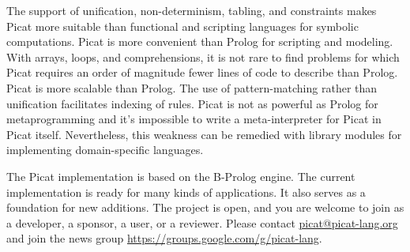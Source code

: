The support of unification, non-determinism, tabling, and constraints makes Picat more suitable than functional and scripting languages for symbolic computations. Picat is more convenient than Prolog for scripting and modeling. With arrays, loops, and comprehensions, it is not rare to find problems for which Picat requires an order of magnitude fewer lines of code to describe than Prolog. Picat is more scalable than Prolog. The use of pattern-matching rather than unification facilitates indexing of rules. Picat is not as powerful as Prolog for metaprogramming and it's impossible to write a meta-interpreter for Picat in Picat itself. Nevertheless, this weakness can be remedied with library modules for implementing domain-specific languages.

The Picat implementation is based on the B-Prolog engine. The current implementation is ready for many kinds of applications. It also serves as a foundation for new additions. The project is open, and you are welcome to join as a developer, a sponsor, a user, or a reviewer. Please contact \url{picat@picat-lang.org} and join the news group \url{https://groups.google.com/g/picat-lang}.



